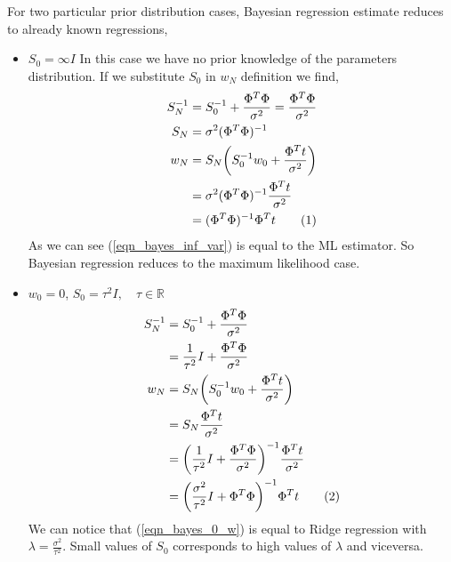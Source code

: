 \documentclass[main.tex]{subfiles}
\newcommand\numberthis{\addtocounter{equation}{1}\tag{\theequation}}
\begin{document}
\newpage
For two particular prior distribution cases, Bayesian regression estimate reduces to already known regressions,
\begin{itemize}
    \item $S_0 = \infty I$
        In this case we have no prior knowledge of the parameters distribution. If we substitute $S_0$ in $w_N$ definition we find,
        \begin{align*}
            S_N^{-1} &= S_0^{-1} + \frac{\Phi^T \Phi}{\sigma^2}
            = \frac{\Phi^T \Phi}{\sigma^2} \\
            S_N &= \sigma^2 (\Phi^T \Phi)^{-1} \\
            w_N &= S_N \bigg( S_0^{-1}w_0 + \frac{\Phi^T t}{\sigma^2} \bigg) \\
            &= \sigma^2 (\Phi^T \Phi)^{-1} \frac{\Phi^T t}{\sigma^2} \\
            &= (\Phi^T \Phi)^{-1} \Phi^T t \numberthis \label{eqn_bayes_inf_var}
        \end{align*}
        As we can see (\ref{eqn_bayes_inf_var}) is equal to the ML estimator. So Bayesian regression reduces to the maximum likelihood case.
    \item $w_0 = 0$, $S_0 = \tau^2 I, \quad \tau \in \mathbb{R}$
        \begin{align*}
            S_N^{-1} &= S_0^{-1} + \frac{\Phi^T \Phi}{\sigma^2}\\
            &= \frac{1}{\tau^2}I + \frac{\Phi^T \Phi}{\sigma^2} \\
            w_N &= S_N \bigg( S_0^{-1}w_0 + \frac{\Phi^T t}{\sigma^2} \bigg) \\
            &= S_N \frac{\Phi^T t}{\sigma^2} \\
            &= \bigg( \frac{1}{\tau^2}I + \frac{\Phi^T \Phi}{\sigma^2} \bigg)^{-1} \frac{\Phi^T t}{\sigma^2} \\
            &= \bigg( \frac{\sigma^2}{\tau^2}I + \Phi^T \Phi \bigg)^{-1} \Phi^T t \numberthis \label{eqn_bayes_0_w}
        \end{align*}
        We can notice that (\ref{eqn_bayes_0_w}) is equal to Ridge regression with $\lambda=\frac{\sigma^2}{\tau^2}$. Small values of $S_0$ corresponds to high values of $\lambda$ and viceversa.
\end{itemize}

\newpage
\end{document}
